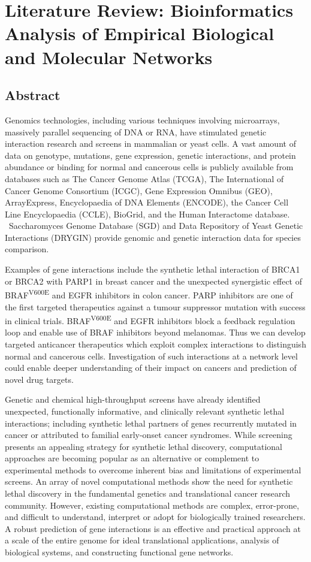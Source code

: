 \chapter{Literature Review: Bioinformatics Analysis of Empirical Biological and
Molecular Networks}
\label{chap:lit_review}

\section{Abstract}
Genomics technologies, including various techniques involving
microarrays, massively parallel sequencing of DNA or RNA, have
stimulated genetic interaction research and screens in mammalian or
yeast cells. A vast amount of data on genotype, mutations, gene
expression, genetic interactions, and protein abundance or binding for
normal and cancerous cells is publicly available from databases such as
The Cancer Genome Atlas (TCGA), The International of Cancer Genome
Consortium (ICGC), Gene Expression Omnibus (GEO), ArrayExpress,
Encyclopaedia of DNA Elements (ENCODE), the Cancer Cell Line
Encyclopaedia (CCLE), BioGrid, and the Human Interactome database.
\ Saccharomyces Genome Database (SGD) and Data Repository of Yeast
Genetic Interactions (DRYGIN) provide genomic and genetic interaction
data for species comparison. 


Examples of gene interactions include the synthetic lethal interaction
of BRCA1 or BRCA2 with PARP1 in breast cancer and the unexpected
synergistic effect of BRAF\textsuperscript{V600E} and EGFR inhibitors
in colon cancer. PARP inhibitors are one of the first targeted
therapeutics against a tumour suppressor mutation with success in
clinical trials. BRAF\textsuperscript{V600E} and EGFR inhibitors
block a feedback regulation loop and enable use of BRAF inhibitors
beyond melanomas. Thus we can develop targeted anticancer
therapeutics which exploit complex interactions to distinguish normal
and cancerous cells. Investigation of such interactions at a network
level could enable deeper understanding of their impact on cancers and
prediction of novel drug targets.


Genetic and chemical high-throughput screens have already identified
unexpected, functionally informative, and clinically relevant synthetic
lethal interactions; including synthetic lethal partners of genes
recurrently mutated in cancer or attributed to familial early-onset
cancer syndromes. While screening presents an appealing strategy for
synthetic lethal discovery, computational approaches are becoming
popular as an alternative or complement to experimental methods to
overcome inherent bias and limitations of experimental screens. An
array of novel computational methods show the need for synthetic lethal
discovery in the fundamental genetics and translational cancer research
community. However, existing computational methods are complex,
error-prone, and difficult to understand, interpret or adopt for
biologically trained researchers. A robust prediction of gene
interactions is an effective and practical approach at a scale of the
entire genome for ideal translational applications, analysis of
biological systems, and constructing functional gene networks.


